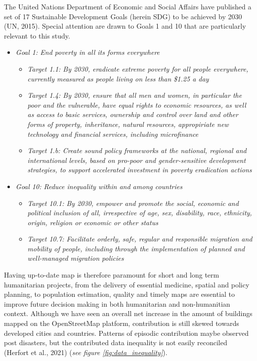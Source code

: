 \documentclass[11pt, a4paper, twoside]{report}
\begin{document}
The United Nations Department of Economic and Social Affairs have published a set of 17 Sustainable Development Goals (herein SDG) to be achieved by 2030 (UN, 2015). Special attention are drawn to Goals 1 and 10 that are particularly relevant to this study.\\\par

\begin{itemize}
  \item \textit{Goal 1: End poverty in all its forms everywhere}
  \begin{itemize}
    \item \textit{Target 1.1: By 2030, eradicate extreme poverty for all people everywhere, currently measured as people living on less than \$1.25 a day}
    \item \textit{Target 1.4: By 2030, ensure that all men and women, in particular the poor and the vulnerable, have equal rights to economic resources, as well as access to basic services, ownership and control over land and other forms of property, inheritance, natural resources, appropiriate new technology and financial services, including microfinance}
    \item \textit{Target 1.b: Create sound policy frameworks at the national, regional and international levels, based on pro-poor and gender-sensitive development strategies, to support accelerated investment in poverty eradication actions}
  \end{itemize}
  \item \textit{Goal 10: Reduce inequality within and among countries}
  \begin{itemize}
    \item \textit{Target 10.1: By 2030, empower and promote the social, economic and political inclusion of all, irrespective of age, sex, disability, race, ethnicity, origin, religion or economic or other status}
    \item \textit{Target 10.7: Facilitate orderly, safe, regular and responsible migration and mobility of people, including through the implementation of planned and well-managed migration policies}
  \end{itemize}
\end{itemize}

Having up-to-date map is therefore paramount for short and long term humanitarian projects, from the delivery of essential medicine, spatial and policy planning, to population estimation, quality and timely maps are essential to improve future decision making in both humanitarian and non-humanitian context. Although we have seen an overall net increase in the amount of buildings mapped on the OpenStreetMap platform, contribution is still skewed towards developed cities and countries. Patterns of episodic contribution maybe observed post disasters, but the contributed data inequality is not easily reconciled (Herfort et al., 2021) (\textit{see figure \ref{fig:data_inequality}}).\\\par
\end{document}
